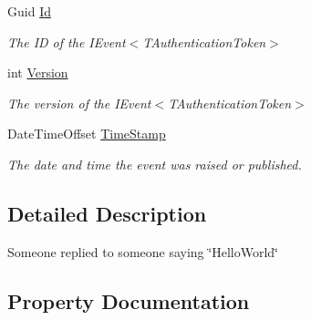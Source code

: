 \begin{DoxyCompactItemize}
Guid \hyperlink{classCqrs_1_1Akka_1_1Tests_1_1Unit_1_1Events_1_1HelloWorldRepliedTo_aadfa9ba9616838db069eaff18b099efe_aadfa9ba9616838db069eaff18b099efe}{Id}
\begin{DoxyCompactList}\small\item\em The ID of the I\+Event$<$\+T\+Authentication\+Token$>$ \end{DoxyCompactList}\item 
int \hyperlink{classCqrs_1_1Akka_1_1Tests_1_1Unit_1_1Events_1_1HelloWorldRepliedTo_a50283ab59b37c6baf5f80625ade780f0_a50283ab59b37c6baf5f80625ade780f0}{Version}
\begin{DoxyCompactList}\small\item\em The version of the I\+Event$<$\+T\+Authentication\+Token$>$ \end{DoxyCompactList}\item 
Date\+Time\+Offset \hyperlink{classCqrs_1_1Akka_1_1Tests_1_1Unit_1_1Events_1_1HelloWorldRepliedTo_a74cd7b24e40d7854b9904e085ffdbb45_a74cd7b24e40d7854b9904e085ffdbb45}{Time\+Stamp}
\begin{DoxyCompactList}\small\item\em The date and time the event was raised or published. \end{DoxyCompactList}\end{DoxyCompactItemize}


\subsection{Detailed Description}
Someone replied to someone saying \char`\"{}\+Hello\+World\char`\"{} 



\subsection{Property Documentation}
\mbox{\label{classCqrs_1_1Akka_1_1Tests_1_1Unit_1_1Events_1_1HelloWorldRepliedTo_a56fdfd09a1c8cf03014600c5d8bf05a9_a56fdfd09a1c8cf03014600c5d8bf05a9}} 
